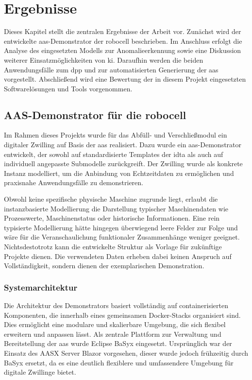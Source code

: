 \newpage
\section{Ergebnisse}
Dieses Kapitel stellt die zentralen Ergebnisse der Arbeit vor. 
Zunächst wird der entwickelte \acs{aas}-Demonstrator der robocell beschrieben.
Im Anschluss erfolgt die Analyse des eingesetzten Modells zur Anomalieerkennung sowie eine Diskussion weiterer Einsatzmöglichkeiten von \acs{ki}.
Daraufhin werden die beiden Anwendungsfälle zum \acs{dpp} und zur automatisierten Generierung der \acs{aas} vorgestellt.
Abschließend wird eine Bewertung der in diesem Projekt eingesetzten Softwarelösungen und Tools vorgenommen.

\subsection{AAS-Demonstrator für die robocell}
Im Rahmen dieses Projekts wurde für das Abfüll- und Verschließmodul ein digitaler Zwilling auf Basis der \acs{aas} realisiert.  
Dazu wurde ein \acs{aas}-Demonstrator entwickelt, der sowohl auf standardisierte Templates der \acs{idta} als auch auf individuell angepasste Submodelle zurückgreift.  
Der Zwilling wurde als konkrete Instanz modelliert, um die Anbindung von Echtzeitdaten zu ermöglichen und praxisnahe Anwendungsfälle zu demonstrieren.

Obwohl keine spezifische physische Maschine zugrunde liegt, erlaubt die instanzbasierte Modellierung die Darstellung typischer Maschinendaten wie Prozesswerte, Maschinenstatus oder historische Informationen.  
Eine rein typisierte Modellierung hätte hingegen überwiegend leere Felder zur Folge und wäre für die Veranschaulichung funktionaler Zusammenhänge weniger geeignet.  
Nichtsdestotrotz kann die entwickelte Struktur als Vorlage für zukünftige Projekte dienen.  
Die verwendeten Daten erheben dabei keinen Anspruch auf Vollständigkeit, sondern dienen der exemplarischen Demonstration.

\subsubsection{Systemarchitektur}
Die Architektur des Demonstrators basiert vollständig auf containerisierten Komponenten, die innerhalb eines gemeinsamen Docker-Stacks organisiert sind.
Dies ermöglicht eine modulare und skalierbare Umgebung, die sich flexibel erweitern und anpassen lässt.
Als zentrale Plattform zur Verwaltung und Bereitstellung der \acs{aas} wurde Eclipse BaSyx eingesetzt.
Ursprünglich war der Einsatz des AASX Server Blazor vorgesehen, dieser wurde jedoch frühzeitig durch BaSyx ersetzt, da es eine deutlich flexiblere und umfassendere Umgebung für digitale Zwillinge bietet.

